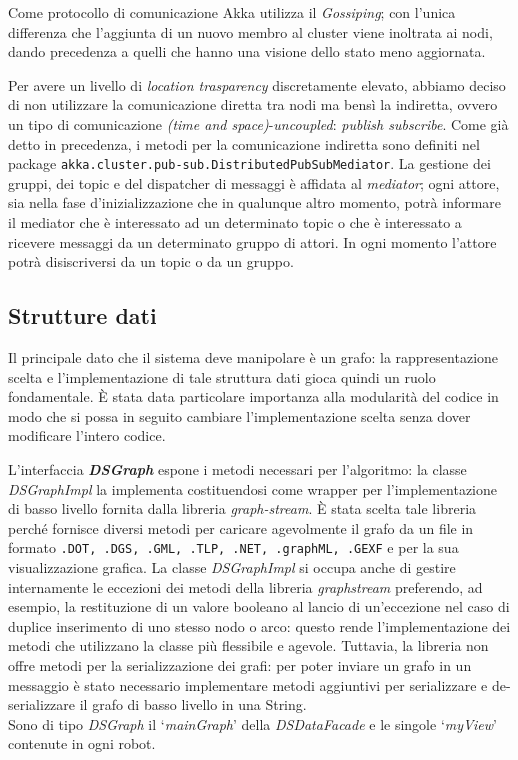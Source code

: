 Come protocollo di comunicazione Akka utilizza il \emph{Gossiping};
con l'unica differenza che l'aggiunta di un nuovo membro al cluster viene
inoltrata ai nodi, dando precedenza a quelli che hanno una visione
dello stato meno aggiornata.

Per avere un livello di \emph{location trasparency} discretamente elevato,
abbiamo deciso di non utilizzare la comunicazione diretta tra nodi ma bensì
la indiretta, ovvero un tipo di comunicazione \emph{(time and space)}-\emph{uncoupled}:
 \emph{publish subscribe}.
Come già detto in precedenza, i metodi per la comunicazione indiretta
sono definiti nel package \texttt{akka.cluster.pub-sub.DistributedPubSubMediator}.
La gestione dei gruppi, dei topic e del dispatcher di messaggi è affidata al \emph{mediator};
ogni attore, sia nella fase d'inizializzazione che in qualunque altro momento, potrà informare
il mediator che è interessato ad un determinato topic o che è interessato a ricevere messaggi
da un determinato gruppo di attori. In ogni momento l'attore potrà disiscriversi da un topic o da un gruppo.
 





\subsection{Strutture dati}
Il principale dato che il sistema deve manipolare è un grafo:
la rappresentazione scelta e l'implementazione di tale struttura dati
gioca quindi un ruolo fondamentale. \`E stata data particolare
importanza alla modularità del codice in modo che si possa in seguito
cambiare l'implementazione scelta senza dover modificare l'intero
codice.

L'interfaccia \textbf{\emph{DSGraph}} espone i metodi necessari per
l'algoritmo: la classe \emph{DSGraphImpl} la implementa costituendosi
come wrapper per l'implementazione di basso livello fornita dalla
libreria \emph{graph-stream}. \`E stata scelta tale libreria perché
fornisce diversi metodi per caricare agevolmente il grafo da un file
in formato \texttt{.DOT, .DGS, .GML, .TLP, .NET, .graphML, .GEXF}
e per la sua visualizzazione grafica.
La classe \emph{DSGraphImpl} si occupa anche di gestire internamente
le eccezioni dei metodi della libreria \emph{graphstream} preferendo,
ad esempio,
la restituzione di un valore booleano al lancio di un'eccezione
nel caso di duplice inserimento di uno stesso nodo o arco: questo
rende l'implementazione dei metodi che utilizzano la classe più
flessibile e agevole.
Tuttavia, la libreria non offre metodi per la serializzazione
dei grafi: per poter inviare un grafo in un messaggio è stato
necessario implementare metodi aggiuntivi per serializzare e
de-serializzare il grafo di basso livello in una String.\\
Sono di tipo \emph{DSGraph} il `\emph{mainGraph}' della
\emph{DSDataFacade} e le singole `\emph{myView}' contenute in ogni
robot.

